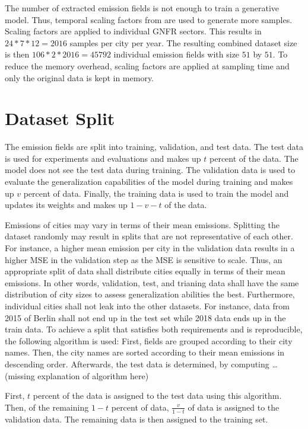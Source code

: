 The number of extracted emission fields is not enough to train a generative model.
Thus, temporal scaling factors from \parencite{ScalingFactors} are used to generate more samples.
Scaling factors are applied to individual GNFR sectors.
This results in $24 * 7 * 12 = 2016$ samples per city per year.
The resulting combined dataset size is then $106 * 2 * 2016 = 45792$ individual emission fields with size $51$ by $51$.
To reduce the memory overhead, scaling factors are applied at sampling time and only the original data is kept in memory.

\section{Dataset Split}
The emission fields are split into training, validation, and test data.
The test data is used for experiments and evaluations and makes up $t$ percent of the data.
The model does not see the test data during training.
The validation data is used to evaluate the generalization capabilities of the model during training and makes up $v$ percent of data.
Finally, the training data is used to train the model and updates its weights and makes up $1 - v - t$ of the data.

Emissions of cities may vary in terms of their mean emissions.
Splitting the dataset randomly may result in splits that are not representative of each other.
For instance, a higher mean emission per city in the validation data results in a higher MSE in the validation step as the MSE is sensitive to scale.
Thus, an appropriate split of data shall distribute cities equally in terms of their mean emissions.
In other words, validation, test, and trianing data shall have the same distribution of city sizes to assess generalization abilities the best. 
Furthermore, individual cities shall not leak into the other datasets.
For instance, data from 2015 of Berlin shall not end up in the test set while 2018 data ends up in the train data.
To achieve a split that satisfies both requirements and is reproducible, the following algorithm is used:
First, fields are grouped according to their city names.
Then, the city names are sorted according to their mean emissions in descending order.
Afterwards, the test data is determined, by computing \dots (missing explanation of algorithm here)

First, $t$ percent of the data is assigned to the test data using this algorithm.
Then, of the remaining $1 - t$ percent of data, $\frac{v}{1 - t}$ of data is assigned to the validation data.
The remaining data is then assigned to the training set.

